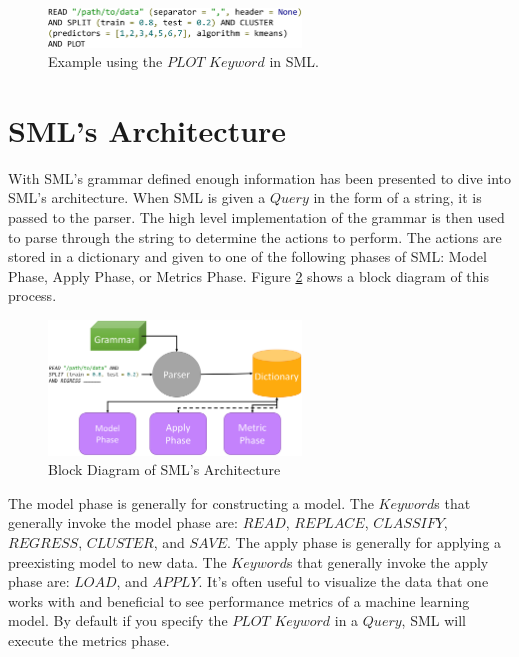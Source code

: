 \documentclass[jair,twoside,11pt,theapa]{article}
\begin{document}
\begin{figure}
\includegraphics[width=0.6\textwidth]{figs/PLOT.png}
\centering
\caption{Example using the \(PLOT\) \(Keyword\) in SML.}
\label{fig:SML:PLOT}
\end{figure}

\section{SML's Architecture}
\label{sml-architecture}

With SML's grammar defined enough information has been presented to dive into SML's architecture. When SML is given a \(Query\) in the form of a string, it is passed to the parser. The high level implementation of the grammar is then used to parse through the string to determine the actions to perform. The actions are stored in a dictionary and given to one of the following phases of SML: Model Phase, Apply Phase, or Metrics Phase. Figure \ref{fig:SML:Architecture} shows a block diagram of this process.

\begin{figure}
\includegraphics[width=0.6\textwidth]{figs/architecture.png}
\centering
\caption{Block Diagram of SML's Architecture}
\label{fig:SML:Architecture}
\end{figure}

The model phase is generally for constructing a model. The \(Keyword\)s that generally invoke the model phase are: \(READ\), \(REPLACE\), \(CLASSIFY\), \(REGRESS\), \(CLUSTER\), and \(SAVE\). The apply phase is generally for applying a preexisting model  to new data. The \(Keyword\)s that generally invoke the apply phase are: \(LOAD\), and \(APPLY\). It's often useful to visualize the data that one works with and beneficial to see performance metrics of a machine learning model. By default if you specify the \(PLOT\) \(Keyword\) in a \(Query\), SML will execute the metrics phase.
\end{document}
